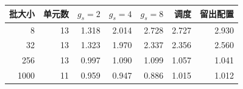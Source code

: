 \begin{tabular}{@{}rrrrrrr@{}}
\toprule
批大小 & 单元数 & $g_s=2$ & $g_s=4$ & $g_s=8$ & 调度 & 留出配置 \\
\midrule
8 & 13 & 1.318 & 2.014 & 2.728 & 2.727 & 2.930 \\
32 & 13 & 1.323 & 1.970 & 2.337 & 2.356 & 2.560 \\
256 & 13 & 0.997 & 1.090 & 1.099 & 1.057 & 1.041 \\
1000 & 11 & 0.959 & 0.947 & 0.886 & 1.015 & 1.012 \\
\bottomrule
\end{tabular}

